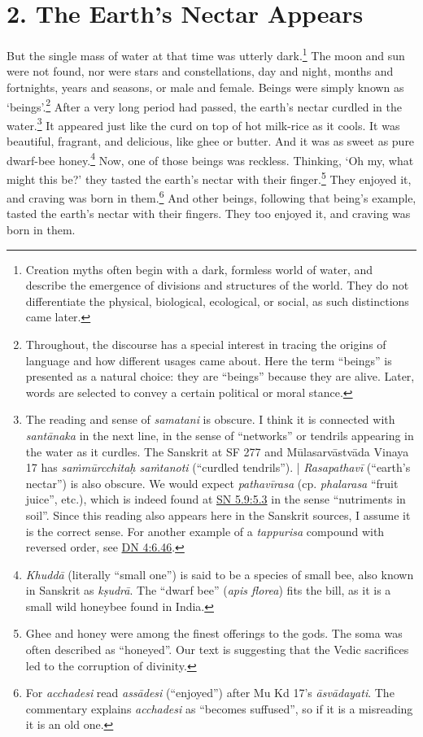 \documentclass[12pt,openany]{book}%
\begin{document}
\section*{2. The Earth’s Nectar Appears }

But the single mass of water at that time was utterly dark.\footnote{Creation myths often begin with a dark, formless world of water, and describe the emergence of divisions and structures of the world. They do not differentiate the physical, biological, ecological, or social, as such distinctions came later. } The moon and sun were not found, nor were stars and constellations, day and night, months and fortnights, years and seasons, or male and female. Beings were simply known as ‘beings’.\footnote{Throughout, the discourse has a special interest in tracing the origins of language and how different usages came about. Here the term “beings” is presented as a natural choice: they are “beings” because they are alive. Later, words are selected to convey a certain political or moral stance. } After a very long period had passed, the earth’s nectar curdled in the water.\footnote{The reading and sense of \textit{samatani} is obscure. I think it is connected with \textit{\textsanskrit{santānaka}} in the next line, in the sense of “networks” or tendrils appearing in the water as it curdles. The Sanskrit at SF 277 and \textsanskrit{Mūlasarvāstvāda} Vinaya 17 has \textit{\textsanskrit{saṁmūrcchitaḥ} \textsanskrit{saṁtanoti}} (“curdled tendrils”). | \textit{\textsanskrit{Rasapathavī}} (“earth’s nectar”) is also obscure. We would expect \textit{\textsanskrit{pathavīrasa}} (cp. \textit{phalarasa} “fruit juice”, etc.), which is indeed found at \href{https://suttacentral.net/sn5.9/en/sujato\#5.3}{SN 5.9:5.3} in the sense “nutriments in soil”. Since this reading also appears here in the Sanskrit sources, I assume it is the correct sense. For another example of a \textit{tappurisa} compound with reversed order, see \href{https://suttacentral.net/dn4/en/sujato\#6.46}{DN 4:6.46}. } It appeared just like the curd on top of hot milk-rice as it cools. It was beautiful, fragrant, and delicious, like ghee or butter. And it was as sweet as pure dwarf-bee honey.\footnote{\textit{\textsanskrit{Khuddā}} (literally “small one”) is said to be a species of small bee, also known in Sanskrit as \textit{\textsanskrit{kṣudrā}}. The “dwarf bee” (\textit{apis florea}) fits the bill, as it is a small wild honeybee found in India. } Now, one of those beings was reckless. Thinking, ‘Oh my, what might this be?’ they tasted the earth’s nectar with their finger.\footnote{Ghee and honey were among the finest offerings to the gods. The soma was often described as “honeyed”. Our text is suggesting that the Vedic sacrifices led to the corruption of divinity. } They enjoyed it, and craving was born in them.\footnote{For \textit{acchadesi} read \textit{\textsanskrit{assādesi}} (“enjoyed”) after Mu Kd 17’s \textit{\textsanskrit{āsvādayati}}. The commentary explains \textit{acchadesi} as “becomes suffused”, so if it is a misreading it is an old one. } And other beings, following that being’s example, tasted the earth’s nectar with their fingers. They too enjoyed it, and craving was born in them. 
\end{document}
